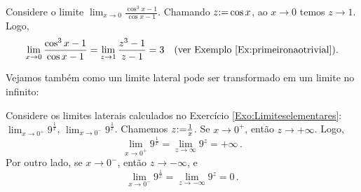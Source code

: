 \begin{ex} Considere o limite 
$\lim_{x\to 0}\frac{\cos^3x-1}{\cos x-1}$. Chamando $z{:=} \cos
x$, ao $x\to 0$ temos $z\to 1$. Logo, 
$$
\lim_{x\to 0}\frac{\cos^3x-1}{\cos x-1}=\lim_{z\to
1}\frac{z^3-1}{z-1}=3\quad\text{(ver Exemplo
\ref{Ex:primeironaotrivial}).}
$$
\end{ex}

Vejamos também como um limite lateral pode ser transformado em um
limite no infinito:

\begin{ex}
Considere os  limites laterais calculados no Exercício
\ref{Exo:Limiteselementares}: $\lim_{x\to 0^+}9^{\frac{1}{x}}$,
$\lim_{x\to 0^-}9^{\frac{1}{x}}$.
Chamemos $z{:=} \frac{1}{x}$. Se $x\to 0^+$, então $z\to
+\infty$. Logo,
$$\lim_{x\to 0^+}9^{\frac{1}{x}}
=\lim_{z\to\infty}9^z=+\infty\,.
$$
Por outro lado, se $x\to 0^-$, então $z\to -\infty$, e
$$\lim_{x\to 0^-}9^{\frac{1}{x}}
=\lim_{z\to-\infty}9^z=0\,.
$$
\end{ex}

